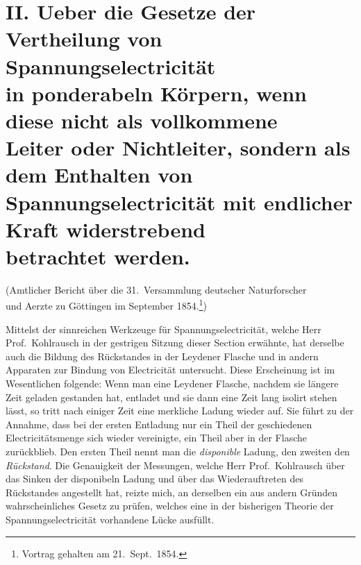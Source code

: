 \documentclass[12pt,a4paper]{book}
\theoremstyle{definition}
\theoremstyle{remark}
\begin{document}

\section*{II. Ueber die Gesetze der Vertheilung von Spannungselectricität\\
in ponderabeln Körpern, wenn diese nicht als vollkommene\\
Leiter oder Nichtleiter, sondern als dem Enthalten von\\
Spannungselectricität mit endlicher Kraft widerstrebend\\
betrachtet werden.}

\begin{center}
\small
(Amtlicher Bericht über die 31.~Versammlung deutscher Naturforscher\\
und Aerzte zu Göttingen im September 1854.\footnote{Vortrag gehalten am 21.~Sept.~1854.})
\end{center}
\vspace{0.5em}

Mittelst der sinnreichen Werkzeuge für Spannungselectricität, welche Herr Prof.\ Kohlrausch in der gestrigen Sitzung dieser Section erwähnte, hat derselbe auch die Bildung des Rückstandes in der Leydener Flasche und in andern Apparaten zur Bindung von Electricität untersucht. Diese Erscheinung ist im Wesentlichen folgende: Wenn man eine Leydener Flasche, nachdem sie längere Zeit geladen gestanden hat, entladet und sie dann eine Zeit lang isolirt stehen lässt, so tritt nach einiger Zeit eine merkliche Ladung wieder auf. Sie führt zu der Annahme, dass bei der ersten Entladung nur ein Theil der geschiedenen Electricitätsmenge sich wieder vereinigte, ein Theil aber in der Flasche zurückblieb. Den ersten Theil nennt man die \textit{disponible} Ladung, den zweiten den \textit{Rückstand}. Die Genauigkeit der Messungen, welche Herr Prof.~Kohlrausch über das Sinken der disponibeln Ladung und über das Wiederauftreten des Rückstandes angestellt hat, reizte mich, an derselben ein aus andern Gründen wahrscheinliches Gesetz zu prüfen, welches eine in der bisherigen Theorie der Spannungselectricität vorhandene Lücke ausfüllt.
\end{document}
